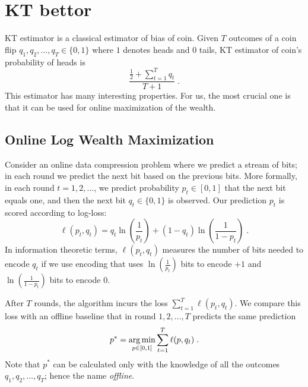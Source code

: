 \section{KT bettor}

\ac{KT} estimator is a classical estimator of bias of coin.
Given $T$ outcomes of a coin flip $q_1, q_2, \dots, q_T \in \{0,1\}$ where $1$
denotes heads and $0$ tails, KT estimator of coin's probability of heads is
$$
\frac{\frac{1}{2} + \sum_{t=1}^T q_t}{T + 1} \; .
$$
This estimator has many interesting properties. For us, the most crucial one is
that it can be used for online maximization of the wealth.


\subsection{Online Log Wealth Maximization}
\label{section:online-data-compression}

Consider an online data compression problem where we predict a stream of bits;
in each round we predict the next bit based on the previous bits.  More
formally, in each round $t=1,2,\dots$, we predict probability $p_t \in [0,1]$
that the next bit equals one, and then the next bit $q_t \in \{0, 1\}$ is
observed.  Our prediction $p_t$ is scored according to log-loss:
$$
\ell(p_t, q_t) = q_t \ln\left( \frac{1}{p_t}\right) + (1-q_t) \ln  \left( \frac{1}{1 - p_t} \right) \; .
$$
In information theoretic terms, $\ell(p_t, q_t)$ measures the number of bits
needed to encode $q_t$ if we use encoding that uses $\ln(\frac{1}{p_t})$ bits
to encode $+1$ and $\ln(\frac{1}{1 - p_t})$ bits to encode $0$.

After $T$ rounds, the algorithm incurs the loss $\sum_{t=1}^T \ell(p_t, q_t)$. We
compare this loss with an offline baseline that in round $1,2,\dots,T$ predicts
the same prediction
$$
p^* = \operatorname*{arg\,min}_{p \in [0,1]} \sum_{t=1}^T \ell(p, q_t) \; .
$$
Note that $p^*$ can be calculated only with the knowledge of all the outcomes
$q_1, q_2, \dots, q_T$; hence the name \emph{offline}.

